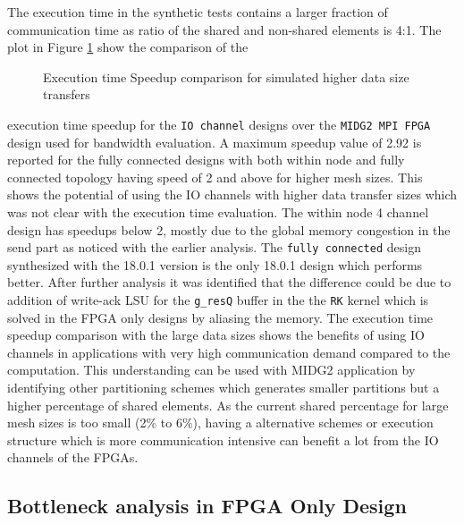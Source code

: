 The execution time in the synthetic tests contains a larger fraction
of communication time as ratio of the shared and non-shared elements
is 4:1. The plot in Figure \ref{plot:bw_speedup} show the comparison of the
\begin{figure}[ht]
	\centering\small
    \scalebox{0.7}{}
    \caption{Execution time Speedup comparison for simulated higher data size transfers}
	\label{plot:bw_speedup}
\end{figure}
execution time speedup for the \texttt{IO channel} designs
over the \texttt{MIDG2 MPI FPGA} design used for bandwidth evaluation.
A maximum speedup value of 2.92 is reported for the fully connected
designs with both within node and fully connected topology
having speed of 2 and above for higher mesh sizes. This shows the potential
of using the IO channels with higher data transfer sizes which was not clear
with the execution time evaluation. The within node 4 channel design has
speedups below 2, mostly due to the global memory congestion in the send
part as noticed with the earlier analysis.
The \texttt{fully connected} design synthesized with the 18.0.1 version is the only
18.0.1 design which performs better. After further analysis it was identified that
the difference could be due to addition of write-ack LSU for the \texttt{g\_resQ}
buffer in the the \texttt{RK} kernel which is solved in the FPGA only designs by aliasing
the memory. The execution time speedup comparison with the large data sizes shows
the benefits of using IO channels in applications with very high communication demand
compared to the computation. This understanding can be used with MIDG2 application
by identifying other partitioning schemes which generates smaller partitions but
a higher percentage of shared elements. As the current shared percentage for large
mesh sizes is too small (2\% to 6\%), having a alternative schemes or execution
structure which is more communication intensive can benefit a lot from the
IO channels of the FPGAs.

\subsection{Bottleneck analysis in FPGA Only Design}

